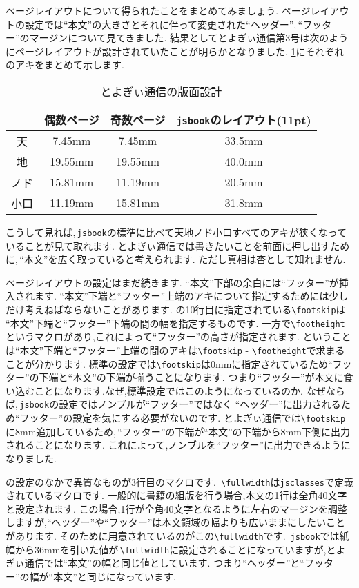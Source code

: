 ページレイアウトについて得られたことをまとめてみましょう.
ページレイアウトの設定では``本文''の大きさとそれに伴って変更された``ヘッダー'',\,``フッター''のマージンについて見てきました.
結果としてとよぎぃ通信第3号は次のようにページレイアウトが設計されていたことが明らかとなりました.
\tablename\ref{tbl:toyogylayout}にそれぞれのアキをまとめて示します.

\begin{table}[!ht]
	\centering
	\caption{とよぎぃ通信の版面設計}
	\label{tbl:toyogylayout}
	\begin{tabular}{c|cc|c} \hline \hline
		& 偶数ページ & 奇数ページ & \verb|jsbook|のレイアウト(11pt) \\ \hline
		天 & 7.45mm & 7.45mm & 33.5mm \\
		地 & 19.55mm & 19.55mm & 40.0mm \\
		ノド & 15.81mm & 11.19mm & 20.5mm \\
		小口 & 11.19mm & 15.81mm & 31.8mm \\ \hline
	\end{tabular}
\end{table}

こうして見れば,\,\verb|jsbook|の標準に比べて天地ノド小口すべてのアキが狭くなっていることが見て取れます.
とよぎぃ通信では書きたいことを前面に押し出すために,\,``本文''を広く取っていると考えられます.
ただし真相は杳として知れません.

ページレイアウトの設定はまだ続きます.
``本文''下部の余白には``フッター''が挿入されます.
``本文''下端と``フッター''上端のアキについて指定するためには少しだけ考えねばならないことがあります.
の10行目に指定されている\verb|\footskip|は
``本文''下端と``フッター''下端の間の幅を指定するものです.
一方で\verb|\footheight|というマクロがあり,これによって``フッター''の高さが指定されます.
ということは``本文''下端と``フッター''上端の間のアキは\verb|\footskip| - \verb|\footheight|で求まることが分かります.
標準の設定では\verb|\footskip|は0mmに指定されているため``フッター''の下端と``本文''の下端が揃うことになります.
つまり``フッター''が本文に食い込むことになります.なぜ,標準設定ではこのようになっているのか.
なぜならば,\,\verb|jsbook|の設定ではノンブルが``フッター''ではなく
``ヘッダー''に出力されるため``フッター''の設定を気にする必要がないのです.
とよぎぃ通信では\verb|\footskip|に8mm追加しているため,\,``フッター''の下端が``本文''の下端から8mm下側に出力されることになります.
これによって,ノンブルを``フッター''に出力できるようになりました.

の設定のなかで異質なものが3行目のマクロです.\,
\verb|\fullwidth|は\verb|jsclasses|で定義されているマクロです.
一般的に書籍の組版を行う場合,本文の1行は全角40文字と設定されます.
この場合,1行が全角40文字となるように左右のマージンを調整しますが,``ヘッダー''や``フッター''は本文領域の幅よりも広いままにしたいことがあります.
そのために用意されているのがこの\verb|\fullwidth|です.\,
\verb|jsbook|では紙幅から36mmを引いた値が\,\verb|\fullwidth|に設定されることになっていますが,とよぎぃ通信では``本文''の幅と同じ値としています.
つまり``ヘッダー''と``フッター''の幅が``本文''と同じになっています.

